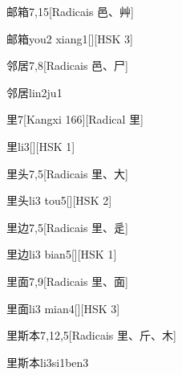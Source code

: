 \begin{entry}{邮箱}{7,15}[Radicais ⾢、⾋]
  \begin{phonetics}{邮箱}{you2 xiang1}[][HSK 3]
  \end{phonetics}
\end{entry}

\begin{entry}{邻居}{7,8}[Radicais ⾢、⼫]
  \begin{phonetics}{邻居}{lin2ju1}
  \end{phonetics}
\end{entry}

\begin{entry}{里}{7}[Kangxi 166][Radical ⾥]
  \begin{phonetics}{里}{li3}[][HSK 1]
  \end{phonetics}
\end{entry}

\begin{entry}{里头}{7,5}[Radicais ⾥、⼤]
  \begin{phonetics}{里头}{li3 tou5}[][HSK 2]
  \end{phonetics}
\end{entry}

\begin{entry}{里边}{7,5}[Radicais ⾥、⾡]
  \begin{phonetics}{里边}{li3 bian5}[][HSK 1]
  \end{phonetics}
\end{entry}

\begin{entry}{里面}{7,9}[Radicais ⾥、⾯]
  \begin{phonetics}{里面}{li3 mian4}[][HSK 3]
  \end{phonetics}
\end{entry}

\begin{entry}{里斯本}{7,12,5}[Radicais ⾥、⽄、⽊]
  \begin{phonetics}{里斯本}{li3si1ben3}
  \end{phonetics}
\end{entry}

